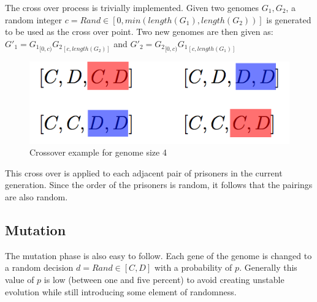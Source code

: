 \documentclass[12pt]{article}
\begin{document}
The cross over process is trivially implemented.  Given two genomes $G_1, G_2$,
a random integer $c = Rand \in [0, min(length(G_1), length(G_2))]$ is generated
to be used as the cross over point.  Two new genomes are then given as:\\

$G'_1 = {G_1}_{[0,c)}{G_2}_{[c, length(G_2)]}$ and
$G'_2 = {G_2}_{[0, c)}{G_1}_{[c, length(G_1)]}$ \\

\begin{figure}[h]
    \centering
    \includegraphics[scale=0.5]{figures/crossover-example.png}
    \caption{Crossover example for genome size 4}
\end{figure}

This cross over is applied to each adjacent pair of prisoners in the current
generation.  Since the order of the prisoners is random, it follows that the pairings
are also random.

\subsection{Mutation}
\label{mutation}

The mutation phase is also easy to follow.  Each gene of the genome is changed
to a random decision $d = Rand \in [C, D]$ with a probability of $p$.  Generally
this value of $p$ is low (between one and five percent) to avoid creating unstable
evolution while still introducing some element of randomness.

\pagebreak
\end{document}
